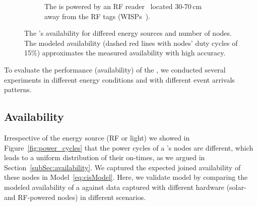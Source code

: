 \begin{figure}[h]
\begin{subfigure}{.66\columnwidth}
                \caption{The \cis is powered by an RF reader~\cite{r420_website} located 30-70\,cm away from the RF tags (WISPs~\cite{smith2006wirelessly}).}
            \label{fig:rfPwrCIS}
        \end{subfigure}
        \caption{The \fullcis's availability for differed energy sources and number of nodes. 
        The modeled availability (dashed red lines with nodes' duty cycles of 15\%) approximates the measured availability with high accuracy.}
        \label{fig:pwrCIS}
\end{figure} 
To evaluate the performance (availability) of the \fullcis, we conducted several experiments in different energy conditions and with different event arrivals patterns. 
%
\subsection{Availability}
Irrespective of the energy source (RF or light) we showed in Figure~\ref{fig:power_cycles} that the power cycles of a \cis's nodes are different, which leads to a uniform distribution of their on-times, as we argued in Section~\ref{subSec:availability}. We captured the expected joined availability of these nodes in Model~\ref{eq:cisModel}.  Here, we validate model by comparing the modeled availability of a \cis against data captured with different hardware (solar- and RF-powered nodes) in different scenarios.
 
